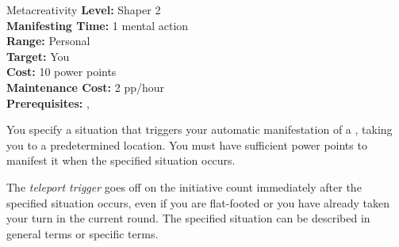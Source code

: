 {Metacreativity}
{
	\textbf{Level:}
	Shaper 2\\
	\textbf{Manifesting Time:}
	1 mental action\\
	\textbf{Range:}
	Personal\\
	\textbf{Target:}
	You\\
	\textbf{Cost:}
	10 power points\\
	\textbf{Maintenance Cost:}
	2 pp/hour\\
	\textbf{Prerequisites:}
	, \\
}
{
	You specify a situation that triggers your automatic manifestation of a , taking you to a predetermined location. You must have sufficient power points to manifest it when the specified situation occurs.

	The \emph{teleport trigger} goes off on the initiative count immediately after the specified situation occurs, even if you are flat-footed or you have already taken your turn in the current round. The specified situation can be described in general terms or specific terms.
}